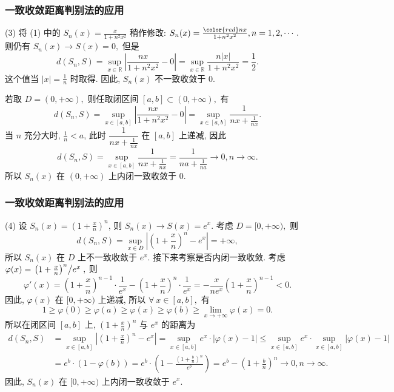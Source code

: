 \begin{frame}
\frametitle{一致收敛距离判别法的应用}

(3) 将 (1) 中的 $S_n(x) = \frac{x}{1 + n^2 x^2}$ 稍作修改: $S_n(x) = \frac{{\color{red}n} x}{1 + n^2 x^2}, n = 1, 2, \cdots.$ 则仍有 $S_n(x) \rightarrow S(x) = 0,$ 但是
\[
d(S_n, S) = \sup_{x \in \mathbb{R}} \left| \frac{n x}{1 + n^2 x^2} - 0 \right| = \sup_{x \in \mathbb{R}} \frac{n |x|}{1 + n^2 x^2} = \frac{1}{2}.
\]
这个值当 $|x| = \frac{1}{n}$ 时取得. 因此, $S_n(x)$ 不一致收敛于 $0.$

\pause

若取 $D = (0, +\infty),$ 则任取闭区间 $[a, b] \subset (0, +\infty),$ 有
\[
d(S_n, S) = \sup_{x \in [a, b]} \left| \frac{n x}{1 + n^2 x^2} - 0 \right| = \sup_{x \in [a, b]} \dfrac{1}{n x + \frac{1}{n x}}.
\]
当 $n$ 充分大时, $\frac{1}{n} < a$, 此时 $\dfrac{1}{n x + \frac{1}{n x}}$ 在 $[a, b]$ 上递减, 因此
\[
d(S_n, S) = \sup_{x \in [a, b]} \dfrac{1}{n x + \frac{1}{n x}} = \dfrac{1}{n a + \frac{1}{n a}} \to 0, n \to \infty.
\]
所以 $S_n(x)$ 在 $(0, +\infty)$ 上内闭一致收敛于 $0.$

\end{frame}


\begin{frame}
\frametitle{一致收敛距离判别法的应用}

(4) 设 $S_n(x) = \left( 1 + \frac{x}{n} \right)^n$, 则 $S_n(x) \rightarrow S(x) = e^x.$ 考虑 $D = [0, +\infty),$ 则
\[
d(S_n, S) = \sup_{x \in D} \left| \left( 1 + \frac{x}{n} \right)^n - e^x \right| = +\infty,
\]
所以 $S_n(x)$ 在 $D$ 上不一致收敛于 $e^x.$
\pause
接下来考察是否内闭一致收敛.
\pause
考虑 $\varphi(x) = \left. \left( 1 + \frac{x}{n} \right)^n \middle/ e^x \right.,$ 则
\[
\varphi'(x) = \left( 1 + \frac{x}{n} \right)^{n-1} \cdot \frac{1}{e^x} - \left( 1 + \frac{x}{n} \right)^n \cdot \frac{1}{e^x} = -\frac{x}{n e^x} \left( 1 + \frac{x}{n} \right)^{n-1} < 0.
\]
因此, $\varphi(x)$ 在 $[0, +\infty)$ 上递减, 所以 $\forall ~ x \in [a, b],$ 有
\[
1 \geqslant \varphi(0) \geqslant \varphi(a) \geqslant \varphi(x) \geqslant \varphi(b) \geqslant \lim_{x \to +\infty} \varphi(x) = 0.
\]
所以在闭区间 $[a, b]$ 上, $\left( 1 + \frac{x}{n} \right)^n$ 与 $e^x$ 的距离为
\begin{align*}
d(S_n, S) & = \sup_{x \in [a, b]} \left| \left( 1 + \frac{x}{n} \right)^n - e^x \right| = \sup_{x \in [a, b]} e^x \cdot \left| \varphi(x) - 1 \right| \leqslant \sup_{x \in [a, b]} e^x \cdot \sup_{x \in [a, b]} \left| \varphi(x) - 1 \right| \\
& = e^b \cdot \left( 1 -  \varphi(b) \right) = e^b \cdot \left( 1 - \frac{\left( 1 + \frac{b}{n} \right)^n}{e^b} \right) = e^b - \left( 1 + \frac{b}{n} \right)^n \to 0, n \to \infty.
\end{align*}
因此, $S_n(x)$ 在 $[0, +\infty)$ 上内闭一致收敛于 $e^x.$

\end{frame}

